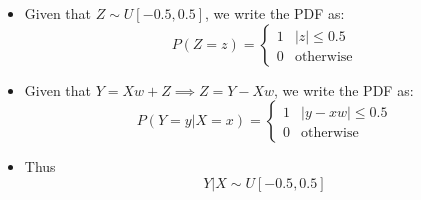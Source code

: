 \begin{itemize}
    \item[] Given that $Z \sim U[-0.5, 0.5]$, we write the PDF as:
	\begin{equation*}
	    P(Z = z) = 
	    \left\{
		\begin{array}{ll}
		    1 & \lvert z \rvert \leq 0.5 \\
		    0 & \textrm{otherwise}
		\end{array}
	    \right.
	\end{equation*}
    \item[] Given that $Y = Xw + Z \implies Z = Y - Xw$, we write the PDF as:
	\begin{equation*}
	    P(Y = y \vert X = x) = 
	    \left\{
		\begin{array}{ll}
		    1 & \lvert y - xw \rvert \leq 0.5 \\
		    0 & \textrm{otherwise}
		\end{array}
	    \right.
	\end{equation*}
    \item[] Thus $$ \boxed{ Y \vert X \sim U[-0.5, 0.5] }$$
\end{itemize}
